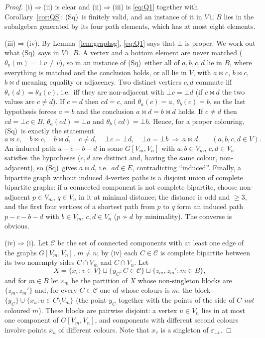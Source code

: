 \documentclass[11pt]{amsart}
\theoremstyle{definition}
\newcommand{\mt}{\bowtie}      %
\newcommand{\Wire}{\textup{(Sq)}}      %
\begin{document}
\begin{proof}
(i)$\Rightarrow$(ii) is clear and (ii)$\Rightarrow$(iii) is \eqref{eq:Q1} together with Corollary~\ref{cor:QS}: \Wire\ is finitely valid, and an instance of it in $V\sqcup B$ lies in the subalgebra generated by its four path elements, which has at most eight elements.

(iii)$\Rightarrow$(iv). By Lemma~\ref{lem:graphsg}, \eqref{eq:Q1} says that $\bot$ is proper. We work out what \Wire\ says in $V\sqcup B$. A vertex and a bottom element are never matched ($\theta_v(m)=\bot v\ne v$), so in an instance of \Wire\ either all of $a,b,c,d$ lie in $B$, where everything is matched and the conclusion holds, or all lie in $V$, with $a\mt c$, $b\mt c$, $b\mt d$ meaning equality or adjacency. Two distinct vertices $c,d$ commute iff $\theta_c(d)=\theta_d(c)$, i.e.\ iff they are non-adjacent with $\bot c=\bot d$ (if $c\mt d$ the two values are $c\ne d$). If $c=d$ then $cd=c$, and $\theta_a(c)=a$, $\theta_b(c)=b$, so the last hypothesis forces $a=b$ and the conclusion $a\mt d=b\mt d$ holds. If $c\ne d$ then $cd=\bot c\in B$, $\theta_a(cd)=\bot a$ and $\theta_b(cd)=\bot b$. Hence, for a proper colouring, \Wire\ is exactly the statement
\[
a\mt c,\quad b\mt c,\quad b\mt d,\quad c\ne d,\quad \bot c=\bot d,\quad \bot a=\bot b\ \Longrightarrow\ a\mt d\qquad(a,b,c,d\in V).
\]
An induced path $a-c-b-d$ in some $G[V_m,V_n]$ with $a,b\in V_m$, $c,d\in V_n$ satisfies the hypotheses ($c,d$ are distinct and, having the same colour, non-adjacent), so \Wire\ gives $a\mt d$, i.e.\ $ad\in E$, contradicting ``induced''. Finally, a bipartite graph without induced $4$-vertex paths is a disjoint union of complete bipartite graphs: if a connected component is not complete bipartite, choose non-adjacent $p\in V_m$, $q\in V_n$ in it at minimal distance; the distance is odd and $\ge3$, and the first four vertices of a shortest path from $p$ to $q$ form an induced path $p-c-b-d$ with $b\in V_m$, $c,d\in V_n$ ($p\not\sim d$ by minimality). The converse is obvious.

(iv)$\Rightarrow$(i). Let $\mathcal C$ be the set of connected components with at least one edge of the graphs $G[V_m,V_n]$, $m\ne n$; by (iv) each $C\in\mathcal C$ is complete bipartite between its two nonempty sides $C\cap V_m$ and $C\cap V_n$. Let
\[
X=\{x_v:v\in V\}\sqcup\{y_C:C\in\mathcal C\}\sqcup\{z_m,z_m':m\in B\},
\]
and for $m\in B$ let $\varepsilon_m$ be the partition of $X$ whose non-singleton blocks are $\{z_m,z_m'\}$ and, for every $C\in\mathcal C$ one of whose colours is $m$, the block $\{y_C\}\cup\{x_u:u\in C\setminus V_m\}$ (the point $y_C$ together with the points of the side of $C$ \emph{not} coloured $m$). These blocks are pairwise disjoint: a vertex $u\in V_n$ lies in at most one component of $G[V_m,V_n]$, and components with different second colours involve points $x_u$ of different colours. Note that $x_v$ is a singleton of $\varepsilon_{\bot v}$.


\end{proof}
\end{document}
